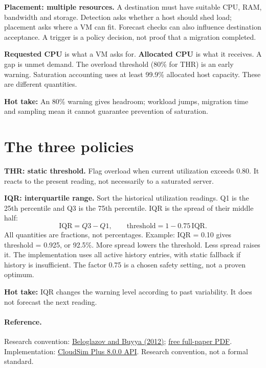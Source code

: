 \documentclass[11pt,a4paper]{article}
\newcommand{\hot}[1]{\par\textbf{Hot take:} #1\par}
\begin{document}
\textbf{Placement: multiple resources.} A destination must have suitable CPU, RAM, bandwidth and storage. Detection asks whether a host should shed load; placement asks where a VM can fit. Forecast checks can also influence destination acceptance. A trigger is a policy decision, not proof that a migration completed.

\textbf{Requested CPU} is what a VM asks for. \textbf{Allocated CPU} is what it receives. A gap is unmet demand. The overload threshold (80\% for THR) is an early warning. Saturation accounting uses at least 99.9\% allocated host capacity. These are different quantities.

\hot{An 80\% warning gives headroom; workload jumps, migration time and sampling mean it cannot guarantee prevention of saturation.}

\newpage
\section{The three policies}
\textbf{THR: static threshold.} Flag overload when current utilization exceeds 0.80. It reacts to the present reading, not necessarily to a saturated server.

\textbf{IQR: interquartile range.} Sort the historical utilization readings. Q1 is the 25th percentile and Q3 is the 75th percentile. IQR is the spread of their middle half:
\[\mathrm{IQR}=Q3-Q1,\qquad \text{threshold}=1-0.75\,\mathrm{IQR}.\]
All quantities are fractions, not percentages. Example: IQR = 0.10 gives threshold = 0.925, or 92.5\%. More spread lowers the threshold. Less spread raises it. The implementation uses all active history entries, with static fallback if history is insufficient. The factor 0.75 is a chosen safety setting, not a proven optimum.
\hot{IQR changes the warning level according to past variability. It does not forecast the next reading.}
\paragraph{Reference.} Research convention: \href{https://doi.org/10.1002/cpe.1867}{Beloglazov and Buyya (2012)}; \href{https://beloglazov.info/papers/2012-optimal-algorithms-ccpe.pdf}{free full-paper PDF}. Implementation: \href{https://javadoc.io/doc/org.cloudsimplus/cloudsim-plus/8.0.0/index.html}{CloudSim Plus 8.0.0 API}. Research convention, not a formal standard.\par
\end{document}
